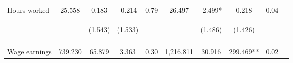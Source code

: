 \begin{table}[h!]
{\begin{tabular}{lccccccccc}
\noalign{\smallskip}Hours worked & 25.558 & 0.183 & -0.214 & 0.79 & 26.497 & -2.499* & 0.218 & 0.04 & \\
 & \begin{footnotesize}\end{footnotesize} & \begin{footnotesize}(1.543)\end{footnotesize} & \begin{footnotesize}(1.533)\end{footnotesize} & \begin{footnotesize}\end{footnotesize} & \begin{footnotesize}\end{footnotesize} & \begin{footnotesize}(1.486)\end{footnotesize} & \begin{footnotesize}(1.426)\end{footnotesize} & \begin{footnotesize}\end{footnotesize} & \begin{footnotesize}\end{footnotesize}\\
 & \begin{footnotesize}\end{footnotesize} & \begin{footnotesize}[0.837]\end{footnotesize} & \begin{footnotesize}[1.000]\end{footnotesize} & \begin{footnotesize}\end{footnotesize} & \begin{footnotesize}\end{footnotesize} & \begin{footnotesize}[0.411]\end{footnotesize} & \begin{footnotesize}[1.000]\end{footnotesize} & \begin{footnotesize}\end{footnotesize} & \begin{footnotesize}\end{footnotesize}\\
\noalign{\smallskip}Wage earnings & 739.230 & 65.879 & 3.363 & 0.30 & 1,216.811 & 30.916 & 299.469** & 0.02 & \\

\end{tabular}}
\end{table}
